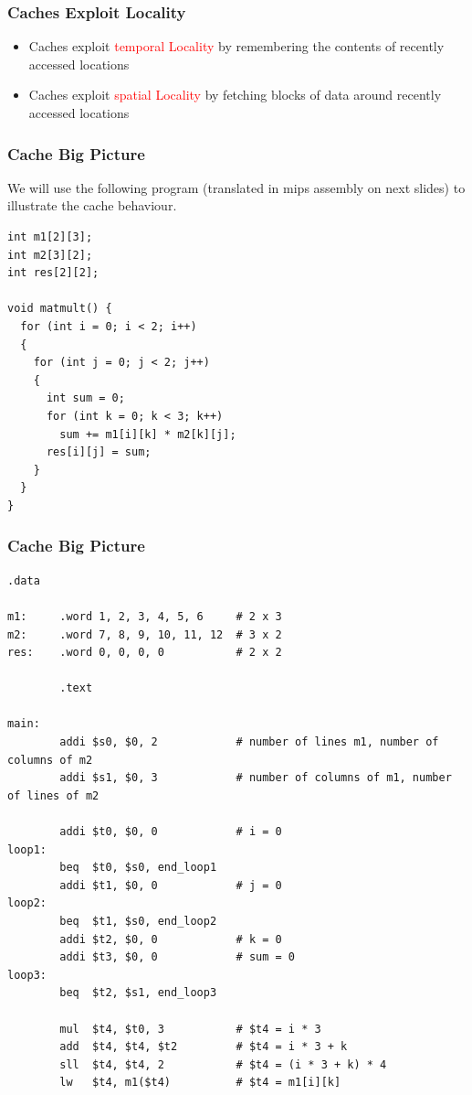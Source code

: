 \documentclass{beamer}
\begin{document}
\begin{frame}%
\frametitle{Caches Exploit Locality}

\begin{itemize}

\item Caches exploit \textcolor{red}{temporal Locality} by remembering the contents of recently accessed locations

\vspace{0.75cm}

\item Caches exploit \textcolor{red}{spatial Locality} by fetching blocks of data around recently accessed locations

\end{itemize}

\end{frame}

\begin{frame}[fragile]
\frametitle{Cache Big Picture}
\scriptsize

We will use the following program (translated in mips assembly on next slides) to illustrate
the cache behaviour.\\
\vspace{0.4cm}
\begin{lstlisting}
int m1[2][3];
int m2[3][2];
int res[2][2];

void matmult() {
  for (int i = 0; i < 2; i++)
  {
    for (int j = 0; j < 2; j++)
    {
      int sum = 0;
      for (int k = 0; k < 3; k++)
        sum += m1[i][k] * m2[k][j];
      res[i][j] = sum;
    }
  }
}
\end{lstlisting}

\end{frame}

\lstset{language=[mips]Assembler}

\begin{frame}[fragile]
\frametitle{Cache Big Picture}
\tiny
\begin{lstlisting}[linebackgroundcolor={\lstcolorlines{27}}]
        .data

m1:     .word 1, 2, 3, 4, 5, 6     # 2 x 3
m2:     .word 7, 8, 9, 10, 11, 12  # 3 x 2
res:    .word 0, 0, 0, 0           # 2 x 2

        .text

main:
        addi $s0, $0, 2            # number of lines m1, number of columns of m2
        addi $s1, $0, 3            # number of columns of m1, number of lines of m2

        addi $t0, $0, 0            # i = 0
loop1:
        beq  $t0, $s0, end_loop1
        addi $t1, $0, 0            # j = 0
loop2:
        beq  $t1, $s0, end_loop2
        addi $t2, $0, 0            # k = 0
        addi $t3, $0, 0            # sum = 0
loop3:
        beq  $t2, $s1, end_loop3

        mul  $t4, $t0, 3           # $t4 = i * 3
        add  $t4, $t4, $t2         # $t4 = i * 3 + k
        sll  $t4, $t4, 2           # $t4 = (i * 3 + k) * 4
        lw   $t4, m1($t4)          # $t4 = m1[i][k]
\end{lstlisting}

\end{frame}
\end{document}
